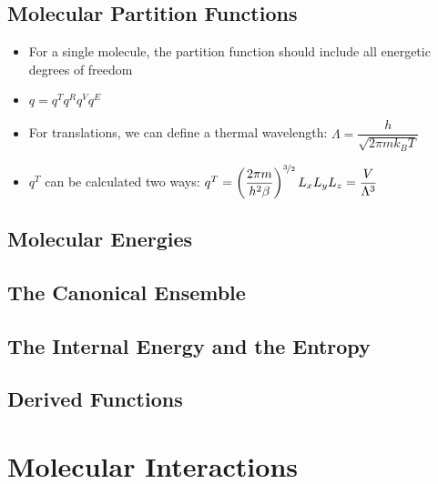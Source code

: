 \documentclass[12pt, openany, letterpaper]{memoir}
\begin{document}
\section{Molecular Partition Functions}
\begin{itemize}
	\item For a single molecule, the partition function should include all energetic degrees of freedom
	\item $q=q^Tq^Rq^Vq^E$
	\item For translations, we can define a thermal wavelength: $\Lambda = \dfrac{h}{\sqrt{2\pi mk_BT}}$
	\item $q^T$ can be calculated two ways: $q^T = \left(\dfrac{2\pi m}{h^2\beta}\right)^{\nicefrac{3}{2}}L_xL_yL_z = \dfrac{V}{\Lambda^3}$
\end{itemize}
\section{Molecular Energies}
\section{The Canonical Ensemble}
\section{The Internal Energy and the Entropy}
\section{Derived Functions}

\chapter{Molecular Interactions}
\end{document}
